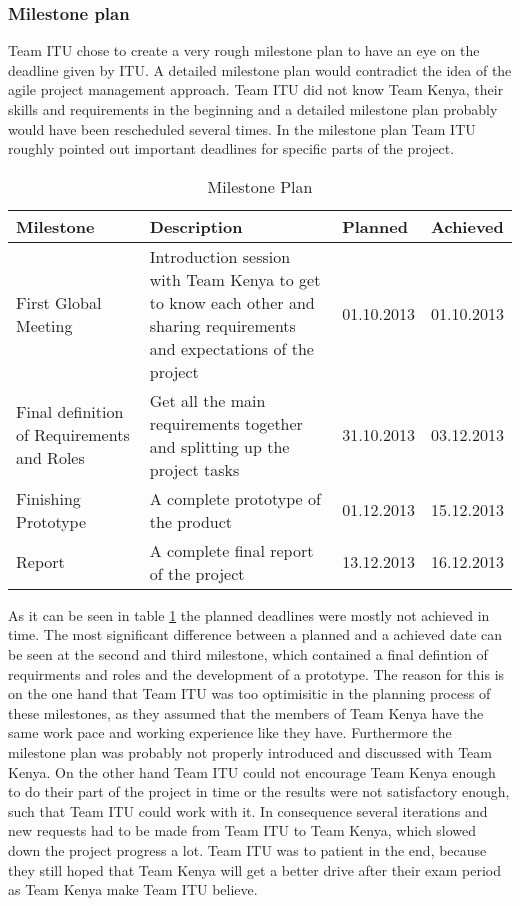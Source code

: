 
\subsubsection{Milestone plan}
\label{sec:milestone_plan}
Team ITU chose to create a very rough milestone plan to have an eye on the deadline given by ITU. A detailed milestone plan would contradict the idea of the agile project management approach. Team ITU did not know Team Kenya, their skills and requirements in the beginning and a detailed milestone plan probably would have been rescheduled several times. In the milestone plan Team ITU roughly pointed out important deadlines for specific parts of the project.

\begin{table}[tb]
	\centering
	\begin{tabular}{ |  p{4cm} |  p{6cm} | l | l |}
    		\hline
   		Milestone & Description & Planned & Achieved \\ \hline
    		First Global Meeting & Introduction session with Team Kenya to get to know each other and sharing requirements and expectations of the project & 01.10.2013 & 01.10.2013 \\ \hline
    		Final definition of Requirements and Roles & Get all the main requirements together and splitting up the project tasks & 31.10.2013 & 03.12.2013 \\ \hline
    		Finishing Prototype & A complete prototype of the product & 01.12.2013 & 15.12.2013\\ \hline
		Report & A complete final report of the project & 13.12.2013 & 16.12.2013\\ \hline
	\end{tabular}
	\caption{Milestone Plan}
	\label{tab:milestones_table}
\end{table}

As it can be seen in table \ref{tab:milestones_table} the planned deadlines were mostly not achieved in time. The most significant difference between a planned and a achieved date can be seen at the second and third milestone, which contained a final defintion of requirments and roles and the development of a prototype. The reason for this is on the one hand that Team ITU was too optimisitic in the planning process of these milestones, as they assumed that the members of Team Kenya have the same work pace and working experience like they have. Furthermore the milestone plan was probably not properly introduced and discussed with Team Kenya. On the other hand Team ITU could not encourage Team Kenya enough to do their part of the project in time or the results were not satisfactory enough, such that Team ITU could work with it. In consequence several iterations and new requests had to be made from Team ITU to Team Kenya, which slowed down the project progress a lot. Team ITU was to patient in the end, because they still hoped that Team Kenya will get a better drive after their exam period as Team Kenya make Team ITU believe.

